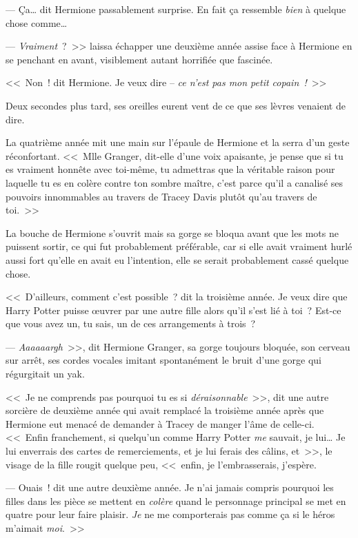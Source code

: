 --- Ça… dit Hermione passablement surprise. En fait ça ressemble \emph{bien} à quelque chose comme…

--- \emph{Vraiment}~?~>> laissa échapper une deuxième année assise face à Hermione en se penchant en avant, visiblement autant horrifiée que fascinée.

<<~Non~! dit Hermione. Je veux dire -- \emph{ce n'est pas mon petit copain~!}~>>

Deux secondes plus tard, ses oreilles eurent vent de ce que ses lèvres venaient de dire.

La quatrième année mit une main sur l'épaule de Hermione et la serra d'un geste réconfortant. <<~Mlle Granger, dit-elle d'une voix apaisante, je pense que si tu es vraiment honnête avec toi-même, tu admettras que la véritable raison pour laquelle tu es en colère contre ton sombre maître, c'est parce qu'il a canalisé ses pouvoirs innommables au travers de Tracey Davis plutôt qu'au travers de toi.~>>

La bouche de Hermione s'ouvrit mais sa gorge se bloqua avant que les mots ne puissent sortir, ce qui fut probablement préférable, car si elle avait vraiment hurlé aussi fort qu'elle en avait eu l'intention, elle se serait probablement cassé quelque chose.

<<~D'ailleurs, comment c'est possible~? dit la troisième année. Je veux dire que Harry Potter puisse œuvrer par une autre fille alors qu'il s'est lié à toi~? Est-ce que vous avez un, tu sais, un de ces arrangements à trois~?

--- \emph{Aaaaaargh}~>>, dit Hermione Granger, sa gorge toujours bloquée, son cerveau sur arrêt, ses cordes vocales imitant spontanément le bruit d'une gorge qui régurgitait un yak.


<<~Je ne comprends pas pourquoi tu es si \emph{déraisonnable}~>>, dit une autre sorcière de deuxième année qui avait remplacé la troisième année après que Hermione eut menacé de demander à Tracey de manger l'âme de celle-ci. <<~Enfin franchement, si quelqu'un comme Harry Potter \emph{me} sauvait, je lui… Je lui enverrais des cartes de remerciements, et je lui ferais des câlins, et~>>, le visage de la fille rougit quelque peu, <<~enfin, je l'embrasserais, j'espère.

--- Ouais~! dit une autre deuxième année. Je n'ai jamais compris pourquoi les filles dans les pièce se mettent en \emph{colère} quand le personnage principal se met en quatre pour leur faire plaisir. \emph{Je} ne me comporterais pas comme ça si le héros m'aimait \emph{moi}.~>>

